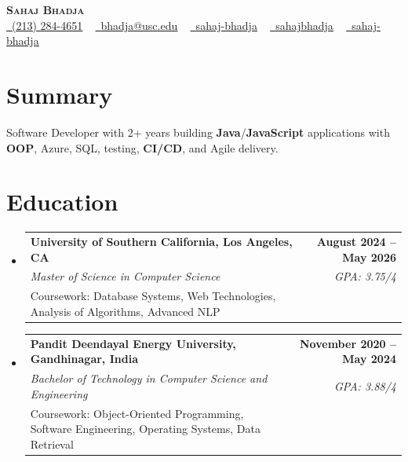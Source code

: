 \documentclass[letterpaper,10pt]{article}
\makeatletter
\newcommand{\sectionGap}{\vspace{-8pt}}
\newcommand{\resumeEduSubheading}[5]{\vspace{-1pt}\item\begin{tabular*}{1.0\textwidth}[t]{l@{\extracolsep{\fill}}r}\textbf{#1} & \textbf{\small #2} \\\textit{\small #3} & \textit{\small #4} \\\small #5 & \\\end{tabular*}\vspace{-4pt}}
\newcommand{\resumeSubHeadingListStart}{\begin{itemize}[leftmargin=0.0in, label={}]}
\newcommand{\resumeSubHeadingListEnd}{\end{itemize}}
\makeatother
\begin{document}
\begin{center}
{\Huge \scshape \textbf{Sahaj Bhadja}} \\ \vspace{1pt}
\small \href{tel:2132844651}{\faPhone\ \underline{(213) 284-4651}} ~ \href{mailto:bhadja@usc.edu}{\raisebox{-0.2\height}\faEnvelope\ \underline{bhadja@usc.edu}} ~
\href{https://www.linkedin.com/in/sahaj-bhadja/}{\raisebox{-0.2\height}\faLinkedin\ \underline{sahaj-bhadja}} ~ \href{https://github.com/SAHAJ-BHADJA}{\raisebox{-0.2\height}\faGithub\ \underline{sahajbhadja}} ~
\href{https://sahaj-bhadja.vercel.app/}{\raisebox{-0.2\height}\faGlobe\ \underline{sahaj-bhadja}}
\end{center}
\vspace{-16pt}
\section{Summary}
\begin{itemize}[leftmargin=0.15in, label={}]
\small{\item{Software Developer with 2+ years building \textbf{Java}/\textbf{JavaScript} applications with \textbf{OOP}, Azure, SQL, testing, \textbf{CI/CD}, and Agile delivery.}}
\end{itemize}
\sectionGap
\section{Education}
\resumeSubHeadingListStart
\resumeEduSubheading{University of Southern California, Los Angeles, CA}{August 2024 -- May 2026}{Master of Science in Computer Science}{GPA: 3.75/4}{Coursework: Database Systems, Web Technologies, Analysis of Algorithms, Advanced NLP}
\resumeEduSubheading{Pandit Deendayal Energy University, Gandhinagar, India}{November 2020 -- May 2024}{Bachelor of Technology in Computer Science and Engineering}{GPA: 3.88/4}{Coursework: Object-Oriented Programming, Software Engineering, Operating Systems, Data Retrieval}
\resumeSubHeadingListEnd
\sectionGap
\end{document}
